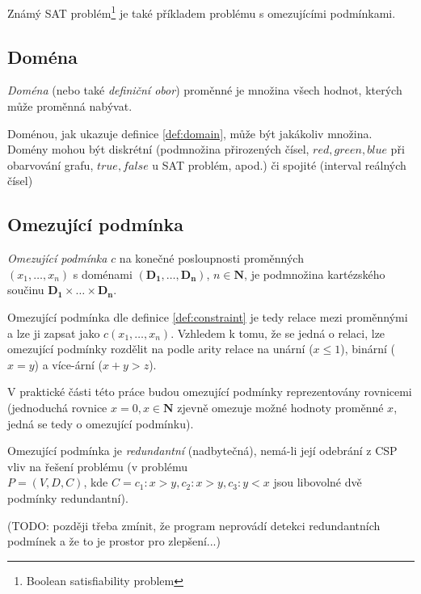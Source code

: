 Známý SAT problém\footnote{Boolean satisfiability problem} je také příkladem problému s omezujícími podmínkami.


\subsection{Doména}
\begin{definition}
\label{def:domain}
\emph{Doména} (nebo také \emph{definiční obor}) proměnné je množina všech hodnot, kterých může proměnná nabývat.
\end{definition}

Doménou, jak ukazuje definice \ref{def:domain}, může být jakákoliv množina. Domény mohou být diskrétní (podmnožina přirozených čísel, ${red, green, blue}$ při obarvování grafu, ${true, false}$ u SAT problém, apod.) či spojité (interval reálných čísel)


\subsection{Omezující podmínka}
\begin{definition}
\label{def:constraint}
\emph{Omezující podmínka} $c$ na konečné posloupnosti proměnných\\$(x_1, \dots, x_n)$ s doménami $(\boldsymbol{D_1}, \dots, \boldsymbol{D_n})$, $n \in \boldsymbol{N}$, je podmnožina kartézského součinu $\boldsymbol{D_1} \times \dots \times \boldsymbol{D_n}$.
\end{definition}

Omezující podmínka dle definice \ref{def:constraint} je tedy relace mezi proměnnými a lze ji zapsat jako $c(x_1, \dots, x_n)$. Vzhledem k tomu, že se jedná o relaci, lze omezující podmínky rozdělit na podle arity relace na unární ($x \leq 1$), binární ($x = y$) a více-ární ($x + y > z $).

V praktické části této práce budou omezující podmínky reprezentovány rovnicemi (jednoduchá rovnice $x = 0, x \in \boldsymbol{N}$ zjevně omezuje možné hodnoty proměnné $x$, jedná se tedy o omezující podmínku).

Omezující podmínka je \emph{redundantní} (nadbytečná), nemá-li její odebrání z CSP vliv na řešení problému (v problému \\ $P = (V, D, C)$, kde $C = {c_1: x > y, c_2: x > y, c_3: y < x}$ jsou libovolné dvě podmínky redundantní).

(TODO: později třeba zmínit, že program neprovádí detekci redundantních podmínek a že to je prostor pro zlepšení...)

